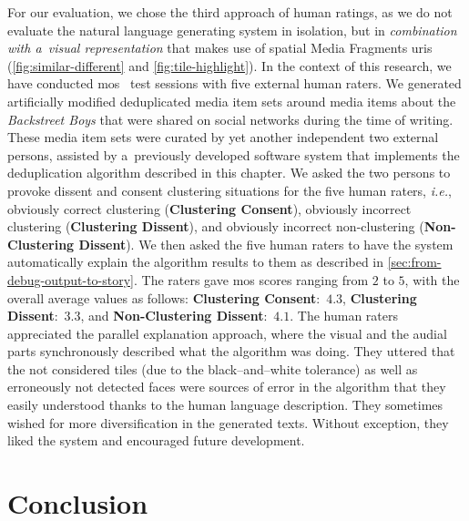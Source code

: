 For our evaluation, we chose the third approach of human ratings,
as we do not evaluate the natural language generating system in isolation,
but in \emph{combination with a~visual representation}
that makes use of spatial Media Fragments {\sc uri}s
(\autoref{fig:similar-different} and \autoref{fig:tile-highlight}).
In the context of this research,
we have conducted {\sc mos}~\cite{itu1998mos} test sessions
with five external human raters.
We generated artificially modified deduplicated media item sets
around media items about the \emph{Backstreet Boys}
that were shared on social networks during the time of writing.
These media item sets were curated by yet another independent two external persons,
assisted by a~previously developed software system
that implements the deduplication algorithm described in this chapter.
We asked the two persons to provoke dissent and consent clustering situations
for the five human raters, \emph{i.e.}, obviously correct clustering
(\textbf{Clustering Consent}), obviously incorrect clustering
(\textbf{Clustering Dissent}), and obviously incorrect non-clustering
(\textbf{Non-Clustering Dissent}).
We then asked the five human raters to have the system
automatically explain the algorithm results to them
as described in \autoref{sec:from-debug-output-to-story}.
The raters gave {\sc mos} scores ranging from $2$ to $5$,
with the overall average values as follows:
\textbf{Clustering Consent}:~$4.3$, \textbf{Clustering Dissent}:~$3.3$,
and \textbf{Non-Clustering Dissent}:~$4.1$.
The human raters appreciated the parallel explanation approach,
where the visual and the audial parts synchronously described
what the algorithm was doing.
They uttered that the not considered tiles (due to the black--and--white tolerance)
as well as erroneously not detected faces were sources of error
in the algorithm that they easily understood
thanks to the human language description.
They sometimes wished for more diversification in the generated texts.
Without exception, they liked the system and encouraged future development.

\section{Conclusion}

